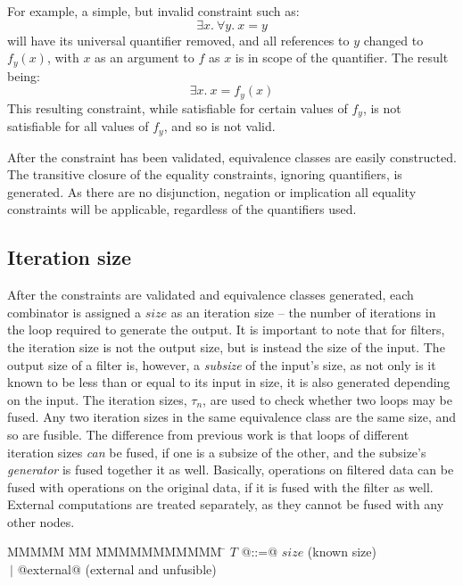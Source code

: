 For example, a simple, but invalid constraint such as:
\[ \exists x.\ \forall y.\ x = y \]
will have its universal quantifier removed, and all references to $y$ changed to $f_y(x)$, with $x$ as an argument to $f$ as $x$ is in scope of the quantifier.
The result being:
\[ \exists x.\ x = f_y(x) \]
This resulting constraint, while satisfiable for certain values of $f_y$, is not satisfiable for all values of $f_y$, and so is not valid.

After the constraint has been validated, equivalence classes are easily constructed.
The transitive closure of the equality constraints, ignoring quantifiers, is generated.
As there are no disjunction, negation or implication all equality constraints will be applicable, regardless of the quantifiers used.


\subsection{Iteration size}
After the constraints are validated and equivalence classes generated, each combinator is assigned a $size$ as an iteration size -- the number of iterations in the loop required to generate the output.
It is important to note that for filters, the iteration size is not the output size, but is instead the size of the input.
The output size of a filter is, however, a \emph{subsize} of the input's size, as not only is it known to be less than or equal to its input in size, it is also generated depending on the input.
The iteration sizes, $\tau_n$, are used to check whether two loops may be fused.
Any two iteration sizes in the same equivalence class are the same size, and so are fusible.
The difference from previous work is that loops of different iteration sizes \emph{can} be fused, if one is a subsize of the other, and the subsize's \emph{generator} is fused together it as well.
Basically, operations on filtered data can be fused with operations on the original data, if it is fused with the filter as well.
External computations are treated separately, as they cannot be fused with any other nodes.

\begin{tabbing}
MMMMM       \= MM \= MMMMMMMMMMM \= \kill
$T$          \> @::=@ \> $size$                                  \> (known size) \\
             \> $~|$  \> @external@                              \> (external and unfusible) \\
\end{tabbing}


